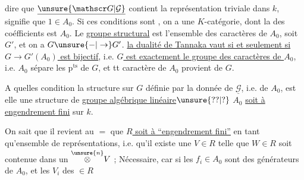 dire que $\underline{\unsure{\mathscr G|\mathcal G}}$ contient la représentation triviale dans $k$,
signifie que $1\in A_0$.  Si 
ces conditions sont ,   on a une
$K$-catégorie, dont la   des coéfficients est
$A_0$. Le \uline{groupe structural} est  l'ensemble des
caractères de $A_0$, soit $G'$, et on a $G\unsure{-|\to}G'$.
  \uline{la dualité de Tannaka vaut si et
seulement si $G\to G'(A_0)$ est bijectif},
i.e. \uline{$G$ est exactement le groupe des
caractères de $A_0$}, i.e. $A_0$ sépare les $\mathrm p^{\mathrm{ts}}$
de $G$, et tt caractère de $A_0$ provient de $G$.

A quelles condition la structure sur $G$ définie
par la donnée de $\underline{\mathscr G}$, i.e. de $A_0$, est
elle une structure de \uline{groupe algébrique
linéaire}$\unsure{??|?}$
 
$A_0$ \uline{soit à engendrement fini} sur $k$.

On sait que il revient au $=$ que
\uline{$R$ soit à ``engendrement fini''} en tant
qu'ensemble de représentations, i.e. qu'il
existe une $V\in R$ telle que 
$W\in R$ soit contenue dans un $\overset{\unsure{n}}{\otimes}V$ ;
Nécessaire, car si les $f_i\in A_0$ sont des
générateurs de $A_0$, et les $V_i$ des $\in R$
